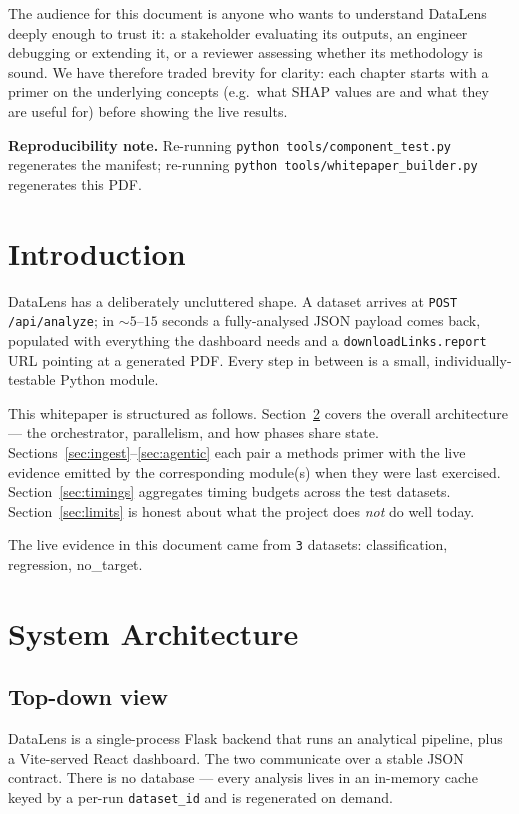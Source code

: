 \documentclass[11pt,a4paper]{article}
\begin{document}
The audience for this document is anyone who wants to understand DataLens
deeply enough to trust it: a stakeholder evaluating its outputs, an
engineer debugging or extending it, or a reviewer assessing whether its
methodology is sound. We have therefore traded brevity for clarity: each
chapter starts with a primer on the underlying concepts (e.g.\ what SHAP
values are and what they are useful for) before showing the live results.

\noindent\textbf{Reproducibility note.} Re-running
\texttt{python tools/component\_test.py} regenerates the manifest;
re-running \texttt{python tools/whitepaper\_builder.py} regenerates this PDF.

\newpage
\tableofcontents
\newpage


\section{Introduction}

DataLens has a deliberately uncluttered shape. A dataset arrives at
\texttt{POST /api/analyze}; in $\sim 5$--$15$ seconds a fully-analysed JSON
payload comes back, populated with everything the dashboard needs and a
\texttt{downloadLinks.report} URL pointing at a generated PDF. Every step in
between is a small, individually-testable Python module.

This whitepaper is structured as follows. Section~\ref{sec:arch} covers the
overall architecture --- the orchestrator, parallelism, and how phases share
state. Sections~\ref{sec:ingest}--\ref{sec:agentic} each pair a methods
primer with the live evidence emitted by the corresponding module(s) when
they were last exercised. Section~\ref{sec:timings} aggregates timing
budgets across the test datasets. Section~\ref{sec:limits} is honest about
what the project does \emph{not} do well today.

The live evidence in this document came from
\texttt{3} datasets:
classification, regression, no\_target.


\section{System Architecture}\label{sec:arch}

\subsection{Top-down view}

DataLens is a single-process Flask backend that runs an analytical pipeline,
plus a Vite-served React dashboard. The two communicate over a stable JSON
contract. There is no database --- every analysis lives in an in-memory cache
keyed by a per-run \texttt{dataset\_id} and is regenerated on demand.
\end{document}
